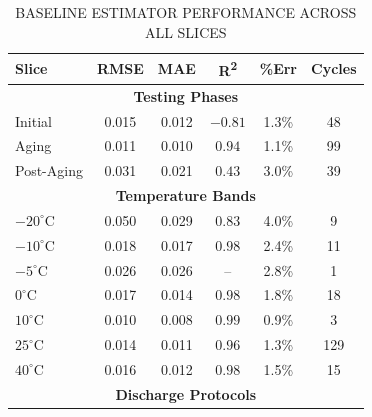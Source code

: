 \begin{table}
	\caption{BASELINE ESTIMATOR PERFORMANCE ACROSS ALL SLICES}
	\label{tab:temp_protocol_results}
	\begin{center}
		\footnotesize
		\begin{tabular}{lccccc}
			\hline
			\textbf{Slice}        & \textbf{RMSE}  & \textbf{MAE}   & \textbf{R\textsuperscript{2}} & \textbf{\%Err} & \textbf{Cycles} \\
			\hline
			\multicolumn{6}{c}{\textbf{Testing Phases}}                                                                                \\
			Initial               & 0.015          & 0.012          & $-0.81$                       & 1.3\%          & 48              \\
			Aging                 & 0.011          & 0.010          & $0.94$                        & 1.1\%          & 99              \\
			Post-Aging            & 0.031          & 0.021          & $0.43$                        & 3.0\%          & 39              \\
			\hline
			\multicolumn{6}{c}{\textbf{Temperature Bands}}                                                                             \\
			$-20^{\circ}\text{C}$ & 0.050          & 0.029          & $0.83$                        & 4.0\%          & 9               \\
			$-10^{\circ}\text{C}$ & 0.018          & 0.017          & $0.98$                        & 2.4\%          & 11              \\
			$-5^{\circ}\text{C}$  & 0.026          & 0.026          & --                            & 2.8\%          & 1               \\
			$0^{\circ}\text{C}$   & 0.017          & 0.014          & $0.98$                        & 1.8\%          & 18              \\
			$10^{\circ}\text{C}$  & 0.010          & 0.008          & $0.99$                        & 0.9\%          & 3               \\
			$25^{\circ}\text{C}$  & 0.014          & 0.011          & $0.96$                        & 1.3\%          & 129             \\
			$40^{\circ}\text{C}$  & 0.016          & 0.012          & $0.98$                        & 1.5\%          & 15              \\
			\hline
			\multicolumn{6}{c}{\textbf{Discharge Protocols}}                                                                           \\

\end{tabular}
\end{center}
\end{table}
